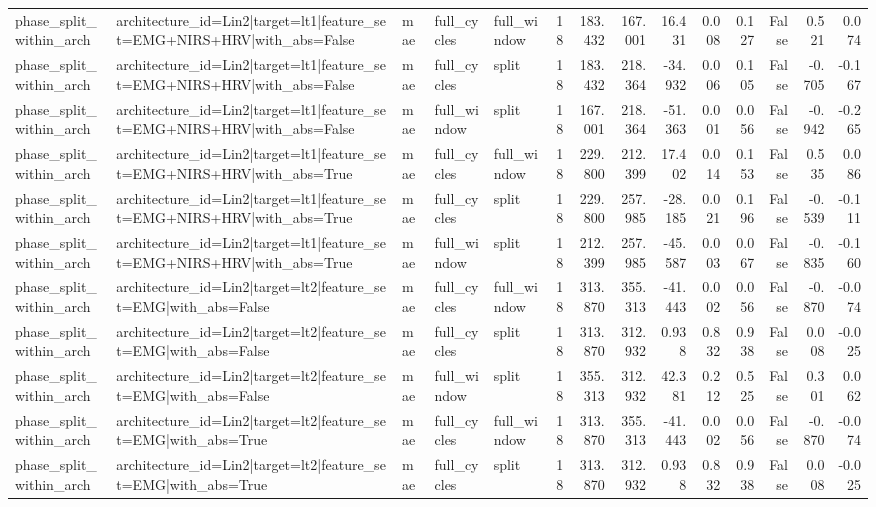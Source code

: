 \begin{table}
\begin{tabular}{lllllrrrrrrrrr}
phase_split_within_arch & architecture_id=Lin2|target=lt1|feature_set=EMG+NIRS+HRV|with_abs=False & mae & full_cycles & full_window & 18 & 183.432 & 167.001 & 16.431 & 0.008 & 0.127 & False & 0.521 & 0.074 \\
phase_split_within_arch & architecture_id=Lin2|target=lt1|feature_set=EMG+NIRS+HRV|with_abs=False & mae & full_cycles & split & 18 & 183.432 & 218.364 & -34.932 & 0.006 & 0.105 & False & -0.705 & -0.167 \\
phase_split_within_arch & architecture_id=Lin2|target=lt1|feature_set=EMG+NIRS+HRV|with_abs=False & mae & full_window & split & 18 & 167.001 & 218.364 & -51.363 & 0.001 & 0.056 & False & -0.942 & -0.265 \\
phase_split_within_arch & architecture_id=Lin2|target=lt1|feature_set=EMG+NIRS+HRV|with_abs=True & mae & full_cycles & full_window & 18 & 229.800 & 212.399 & 17.402 & 0.014 & 0.153 & False & 0.535 & 0.086 \\
phase_split_within_arch & architecture_id=Lin2|target=lt1|feature_set=EMG+NIRS+HRV|with_abs=True & mae & full_cycles & split & 18 & 229.800 & 257.985 & -28.185 & 0.021 & 0.196 & False & -0.539 & -0.111 \\
phase_split_within_arch & architecture_id=Lin2|target=lt1|feature_set=EMG+NIRS+HRV|with_abs=True & mae & full_window & split & 18 & 212.399 & 257.985 & -45.587 & 0.003 & 0.067 & False & -0.835 & -0.160 \\
phase_split_within_arch & architecture_id=Lin2|target=lt2|feature_set=EMG|with_abs=False & mae & full_cycles & full_window & 18 & 313.870 & 355.313 & -41.443 & 0.002 & 0.056 & False & -0.870 & -0.074 \\
phase_split_within_arch & architecture_id=Lin2|target=lt2|feature_set=EMG|with_abs=False & mae & full_cycles & split & 18 & 313.870 & 312.932 & 0.938 & 0.832 & 0.938 & False & 0.008 & -0.025 \\
phase_split_within_arch & architecture_id=Lin2|target=lt2|feature_set=EMG|with_abs=False & mae & full_window & split & 18 & 355.313 & 312.932 & 42.381 & 0.212 & 0.525 & False & 0.301 & 0.062 \\
phase_split_within_arch & architecture_id=Lin2|target=lt2|feature_set=EMG|with_abs=True & mae & full_cycles & full_window & 18 & 313.870 & 355.313 & -41.443 & 0.002 & 0.056 & False & -0.870 & -0.074 \\
phase_split_within_arch & architecture_id=Lin2|target=lt2|feature_set=EMG|with_abs=True & mae & full_cycles & split & 18 & 313.870 & 312.932 & 0.938 & 0.832 & 0.938 & False & 0.008 & -0.025 \\

\end{tabular}
\end{table}
